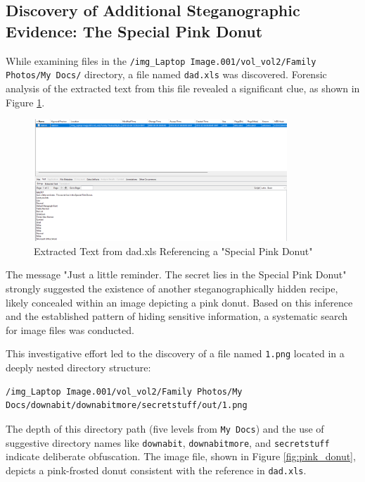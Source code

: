 \subsection{Discovery of Additional Steganographic Evidence: The Special Pink Donut}
While examining files in the \texttt{/img\_Laptop Image.001/vol\_vol2/Family Photos/My Docs/} directory, a file named \texttt{dad.xls} was discovered. Forensic analysis of the extracted text from this file revealed a significant clue, as shown in Figure \ref{fig:dad_xls}.

\begin{figure}[h]
    \centering
    \includegraphics[width=0.85\textwidth]{images/Artifact and Evidence Recovery/dad_xls.png}
    \caption{Extracted Text from dad.xls Referencing a "Special Pink Donut"}
    \label{fig:dad_xls}
\end{figure}

The message "Just a little reminder. The secret lies in the Special Pink Donut" strongly suggested the existence of another steganographically hidden recipe, likely concealed within an image depicting a pink donut. Based on this inference and the established pattern of hiding sensitive information, a systematic search for image files was conducted.

This investigative effort led to the discovery of a file named \texttt{1.png} located in a deeply nested directory structure:
\begin{verbatim}
/img_Laptop Image.001/vol_vol2/Family Photos/My Docs/downabit/downabitmore/secretstuff/out/1.png
\end{verbatim}

The depth of this directory path (five levels from \texttt{My Docs}) and the use of suggestive directory names like \texttt{downabit}, \texttt{downabitmore}, and \texttt{secretstuff} indicate deliberate obfuscation. The image file, shown in Figure \ref{fig:pink_donut}, depicts a pink-frosted donut consistent with the reference in \texttt{dad.xls}.

